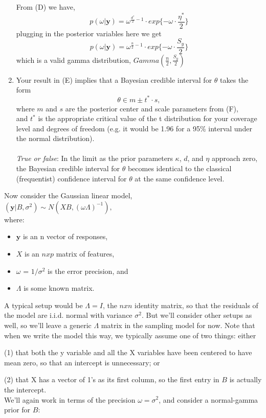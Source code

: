 \documentclass{homework}
\begin{document}
\begin{enumerate}[label=(\Alph*)]
From (D) we have,
$$p(\omega | \textbf{y}) = \omega^{\frac{d^*}{2} - 1} \cdot exp\{-\omega \cdot \frac{\eta^*}{2}\}  $$
plugging in the posterior variables here we get
$$ p(\omega | \textbf{y}) = \omega^{\frac{n}{2} - 1} \cdot exp\{-\omega \cdot \frac{S_y}{2}\}  $$
which is a valid gamma distribution,  $Gamma(\frac{n}{2}, \frac{S_y}{2})$ \\

\item Your result in (E) implies that a Bayesian credible interval for $\theta$ takes the form 
$$ \theta \in m \pm t^* \cdot s ,$$ where $m$ and $s$ are the posterior center and scale parameters from (F), \\and $t^*$ is the appropriate critical value of the t distribution for your coverage level and degrees of freedom (e.g. it would be 1.96 for a 95\% interval under the normal distribution).\\ \\
\textit{True or false}: In the limit as the prior parameters $\kappa$, $d$, and $\eta$ approach zero, \\the Bayesian credible interval for $\theta$ becomes identical to the classical (frequentist) confidence interval for $\theta$ at the same confidence level.
\end{enumerate}


Now consider the Gaussian linear model,\\
$( \textbf{y} | B, \sigma^2) \sim N(XB, (\omega\Lambda)^{-1}),$ \\where: 
\begin{itemize}
\item $\textbf{y}$ is an n vector of responses, 
\item $X$ is an $n x p$ matrix of features, 
\item $\omega$ = $1/\sigma^2$ is the error precision, and 
\item $\Lambda$ is some known matrix. 
\end{itemize}
A typical setup would be $\Lambda = I$, the $n x n$ identity matrix, so that the residuals of the model are i.i.d. normal with variance $\sigma^2$. But we'll consider other setups as well, so we'll leave a generic $\Lambda$ matrix in the sampling model for now.  Note that when we write the model this way, we typically assume one of two things: either \par(1) that both the y variable and all the X variables have been centered to have mean zero, so that an intercept is unnecessary; or \par(2) that X has a vector of 1's as its first column, so the first entry in $B$ is actually the intercept.
\\We'll again work in terms of the precision $\omega = \sigma^2$, and consider a normal-gamma prior for $B$:
\end{document}
